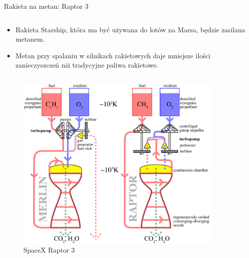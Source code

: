 \begin{columnframe}{Rakieta na metan: Raptor 3}
    \begin{column}{0.5\textwidth}
        \begin{itemize}
            \item Rakieta Starship, która ma być używana do lotów na Marsa, będzie zasilana metanem.
            \item Metan przy spalaniu w silnikach rakietowych daje mniejsze ilości zanieczyszczeń niż tradycyjne paliwa rakietowe.
        \end{itemize}
    \end{column}
    \begin{column}{0.5\textwidth}
        \begin{figure}
            \centering
            \includegraphics[width=0.9\textwidth, frame]{images/Raptor3_Merlin_comparison.png}
            \caption{SpaceX Raptor 3}
        \end{figure}
    \end{column}
\end{columnframe}

